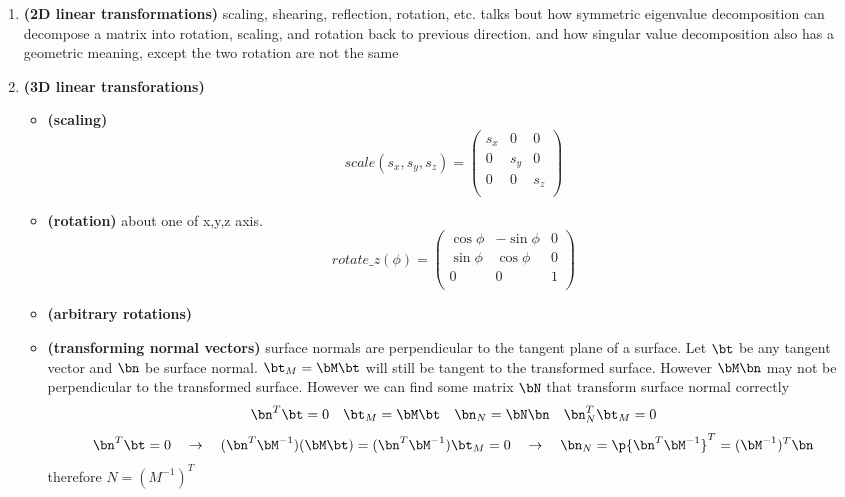 \documentclass[11pt]{article}
\newcommand{\bheading}[1]{\textbf{(#1)}}
\begin{document}
\begin{enumerate}
    \item \bheading{2D linear transformations} scaling, shearing, reflection, rotation, etc. talks bout how symmetric eigenvalue decomposition can decompose a matrix into rotation, scaling, and rotation back to previous direction. and how singular value decomposition also has a geometric meaning, except the two rotation are not the same
    \item \bheading{3D linear transforations}
    \begin{itemize}
        \item \bheading{scaling}
        \[
            scale(s_x,s_y,s_z) = 
            \begin{pmatrix}
                s_x & 0 & 0 \\ 
                0 & s_y & 0 \\
                0 & 0 & s_z \\
            \end{pmatrix}  
        \]
        \item \bheading{rotation} about one of x,y,z axis.
        \[
            rotate\_z(\phi) = 
            \begin{pmatrix}
                \cos \phi & -\sin \phi & 0 \\
                \sin \phi & \cos \phi & 0 \\
                0 & 0 & 1 \\
            \end{pmatrix}
        \]
        \item \bheading{arbitrary rotations}
        \item \bheading{transforming normal vectors} surface normals are perpendicular to the tangent plane of a surface. Let $\bt$ be any tangent vector and $\bn$ be surface normal. $\bt_M = \bM\bt$ will still be tangent to the transformed surface. However $\bM\bn$ may not be perpendicular to the transformed surface. However we can find some matrix $\bN$ that transform surface normal correctly
        \[
            \bn^T \bt = 0 
            \quad
            \bt_M = \bM\bt
            \quad
            \bn_N = \bN\bn
            \quad
            \bn_N^T \bt_M = 0
        \]
        \[
            \bn^T \bt = 0 
            \quad\rightarrow\quad 
            (\bn^T \bM^{-1})(\bM \bt) = (\bn^T\bM^{-1})\bt_M = 0
            \quad\rightarrow\quad 
            \bn_N = \p{\bn^T \bM^{-1}}^T = (\bM^{-1})^T \bn
        \]
        therefore $N = (M^{-1})^T$
    \end{itemize}

\end{enumerate}
\end{document}

